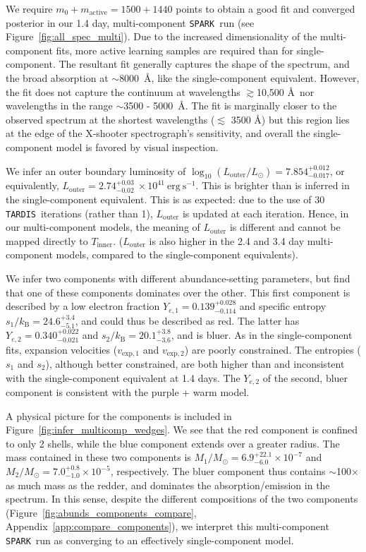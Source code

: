 \documentclass[twocolumn,twocolappendix]{aastex63}
\def\SPARK{\texttt{SPARK}}
\def\TARDIS{\texttt{TARDIS}}
\begin{document}
We require $m_0 + m_{\mathrm{active}} = 1500 + 1440$ points to obtain a good fit and converged posterior in our 1.4 day, multi-component \SPARK~run (see Figure~\ref{fig:all_spec_multi}). Due to the increased dimensionality of the multi-component fits, more active learning samples are required than for single-component. The resultant fit generally captures the shape of the spectrum, and the broad absorption at $\sim$8000~\AA, like the single-component equivalent. However, the fit does not capture the continuum at wavelengths $\gtrsim$10,500 \AA~nor wavelengths in the range $\sim$3500 - 5000~\AA. The fit is marginally closer to the observed spectrum at the shortest wavelengths ($\lesssim$ 3500 \AA) but this region lies at the edge of the X-shooter spectrograph's sensitivity, and overall the single-component model is favored by visual inspection. 

We infer an outer boundary luminosity of $\log_{10} (L_{\mathrm{outer}}/L_{\odot}) = 7.854^{+0.012}_{-0.017}$, or equivalently, $L_{\mathrm{outer}} = 2.74^{+0.03}_{-0.02}~\times 10^{41}~\mathrm{erg~s^{-1}}$. This is brighter than is inferred in the single-component equivalent. This is as expected: due to the use of 30 \TARDIS~iterations (rather than 1), $L_{\mathrm{outer}}$ is updated at each iteration. Hence, in our multi-component models, the meaning of $L_{\mathrm{outer}}$ is different and cannot be mapped directly to $T_{\mathrm{inner}}$. ($L_{\mathrm{outer}}$ is also higher in the 2.4 and 3.4 day multi-component models, compared to the single-component equivalents).

We infer two components with different abundance-setting parameters, but find that one of these components dominates over the other. This first component is described by a low electron fraction $Y_{e,1} = 0.139^{+0.028}_{-0.114}$ and specific entropy $s_1 / k_{\mathrm{B}} = 24.6^{+3.4}_{-5.1}$, and could thus be described as red. The latter has $Y_{e,2} = 0.340^{+0.022}_{-0.021}$ and $s_2 / k_{\mathrm{B}} = 20.1^{+3.8}_{-3.6}$, and is bluer. As in the single-component fits, expansion velocities ($v_{\mathrm{exp},1}$ and $v_{\mathrm{exp},2}$) are poorly constrained. The entropies ($s_1$ and $s_2$), although better constrained, are both higher than and inconsistent with the single-component equivalent at 1.4 days. The $Y_{e,2}$ of the second, bluer component is consistent with the purple + warm model.  

A physical picture for the components is included in Figure~\ref{fig:infer_multicomp_wedges}. We see that the red component is confined to only 2 shells, while the blue component extends over a greater radius. The mass contained in these two components is $M_1/M_{\odot} = 6.9^{+22.1}_{-6.0} \times 10^{-7}$ and $M_2/M_{\odot} = 7.0^{+0.8}_{-1.0} \times 10^{-5}$, respectively. The bluer component thus contains $\sim$100$\times$ as much mass as the redder, and dominates the absorption/emission in the spectrum. In this sense, despite the different compositions of the two components (Figure~\ref{fig:abunds_components_compare}, Appendix~\ref{app:compare_components}), we interpret this multi-component \SPARK~run as converging to an effectively single-component model.
\end{document}
